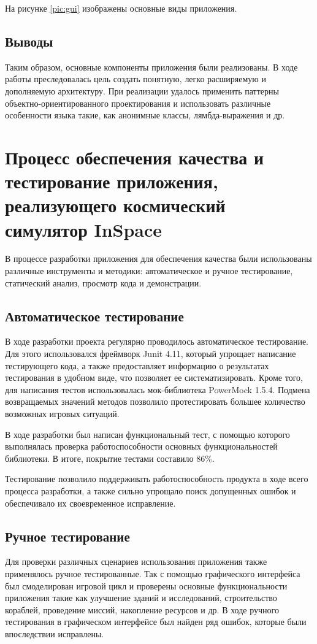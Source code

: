  На рисунке \ref{pic:gui} изображены основные виды приложения.


  

\subsection{Выводы}
Таким образом, основные компоненты приложения были реализованы. В ходе работы преследовалась цель создать понятную, легко расширяемую и дополняемую архитектуру. При реализации удалось применить паттерны объектно-ориентированного проектирования и использовать различные особенности языка такие, как анонимные классы, лямбда-выражения и др. 
   
\section{Процесс обеспечения качества и тестирование приложения, реализующего космический симулятор InSpace}

В процессе разработки приложения для обеспечения качества были использованы различные инструменты и методики: автоматическое и ручное тестирование, статический анализ, просмотр кода и демонстрации.

\subsection{Автоматическое тестирование}

В ходе разработки проекта регулярно проводилось автоматическое тестирование. Для этого использовался фреймворк Junit 4.11, который упрощает написание тестирующего кода, а также предоставляет информацию о результатах тестирования в удобном виде, что позволяет ее систематизировать. Кроме того, для написания тестов использовалась мок-библиотека PowerMock 1.5.4. Подмена возвращаемых значений методов позволило протестировать большее количество возможных игровых ситуаций. 

В ходе разработки был написан функциональный тест, с помощью которого выполнялась проверка работоспособности основных функциональностей библиотеки. В итоге, покрытие тестами составило 86\%.

Тестирование позволило поддерживать работоспособность продукта в ходе всего процесса разработки, а также сильно упрощало поиск допущенных ошибок и обеспечивало их своевременное исправление.   

\subsection{Ручное тестирование}
Для проверки различных сценариев использования приложения также применялось ручное тестированные. Так с помощью графического интерфейса был смоделирован игровой цикл и проверены основные функциональности приложения такие как улучшение зданий и исследований, строительство кораблей, проведение миссий, накопление ресурсов и др. В ходе ручного тестирования в графическом интерфейсе был найден ряд ошибок, которые были впоследствии исправлены. 

